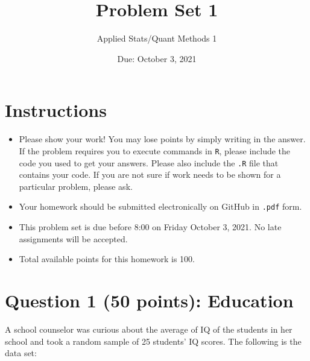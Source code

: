 \documentclass[12pt,letterpaper]{article}
\title{Problem Set 1}
\date{Due: October 3, 2021}
\author{Applied Stats/Quant Methods 1}
\begin{document}
	\maketitle
	
	\section*{Instructions}
	\begin{itemize}
		\item Please show your work! You may lose points by simply writing in the answer. If the problem requires you to execute commands in \texttt{R}, please include the code you used to get your answers. Please also include the \texttt{.R} file that contains your code. If you are not sure if work needs to be shown for a particular problem, please ask.
		\item Your homework should be submitted electronically on GitHub in \texttt{.pdf} form.
		\item This problem set is due before 8:00 on Friday October 3, 2021. No late assignments will be accepted.
		\item Total available points for this homework is 100.
	\end{itemize}
	
	\vspace{1cm}
	\section*{Question 1 (50 points): Education}
	
	A school counselor was curious about the average of IQ of the students in her school and took a random sample of 25 students' IQ scores. The following is the data set:\\
	\vspace{.5cm}
	

	
	\vspace{1cm}
	
\end{document}
